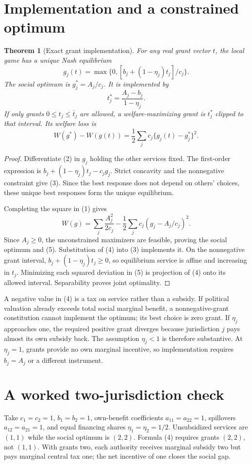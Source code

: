 \documentclass[11pt,a4paper]{article}
\newtheorem{theorem}{Theorem}[section]
\begin{document}
\section{Implementation and a constrained optimum}
\begin{theorem}[Exact grant implementation]
For any real grant vector $t$, the local game has a unique Nash equilibrium
\[
 g_j(t)=\max\{0,[b_j+(1-\eta_j)t_j]/c_j\}.                 \tag{3}
\]
The social optimum is $g_j^*=A_j/c_j$. It is implemented by
\[
 t_j^*=\frac{A_j-b_j}{1-\eta_j}.                          \tag{4}
\]
If only grants $0\le t_j\le\overline t_j$ are allowed, a welfare-maximizing grant is $t_j^*$ clipped to that interval. Its welfare loss is
\[
 W(g^*)-W(g(t))=\frac12\sum_jc_j\{g_j(t)-g_j^*\}^2.        \tag{5}
\]
\end{theorem}
\begin{proof}
Differentiate (2) in $g_j$ holding the other services fixed. The first-order expression is $b_j+(1-\eta_j)t_j-c_jg_j$. Strict concavity and the nonnegative constraint give (3). Since the best response does not depend on others' choices, these unique best responses form the unique equilibrium.

Completing the square in (1) gives
\[
 W(g)=\sum_j\frac{A_j^2}{2c_j}
      -\frac12\sum_jc_j(g_j-A_j/c_j)^2.
\]
Since $A_j\ge0$, the unconstrained maximizers are feasible, proving the social optimum and (5). Substitution of (4) into (3) implements it. On the nonnegative grant interval, $b_j+(1-\eta_j)t_j\ge0$, so equilibrium service is affine and increasing in $t_j$. Minimizing each squared deviation in (5) is projection of (4) onto its allowed interval. Separability proves joint optimality.
\end{proof}

A negative value in (4) is a tax on service rather than a subsidy. If political valuation already exceeds total social marginal benefit, a nonnegative-grant constitution cannot implement the optimum; its best choice is zero grant. If $\eta_j$ approaches one, the required positive grant diverges because jurisdiction $j$ pays almost its own subsidy back. The assumption $\eta_j<1$ is therefore substantive. At $\eta_j=1$, grants provide no own marginal incentive, so implementation requires $b_j=A_j$ or a different instrument.

\section{A worked two-jurisdiction check}
Take $c_1=c_2=1$, $b_1=b_2=1$, own-benefit coefficients $a_{11}=a_{22}=1$, spillovers $a_{12}=a_{21}=1$, and equal financing shares $\eta_1=\eta_2=1/2$. Unsubsidized services are $(1,1)$ while the social optimum is $(2,2)$. Formula (4) requires grants $(2,2)$, not $(1,1)$. With grants two, each authority receives marginal subsidy two but pays marginal central tax one; the net incentive of one closes the social gap.
\end{document}
